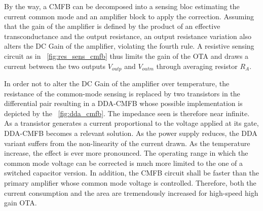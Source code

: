 By the way, a CMFB can be decomposed into a sensing bloc estimating the current common mode and an amplifier block to apply the correction. Assuming that the gain of the amplifier is defined by the product of an effective transconductance and the output resistance, an output resistance variation also alters the DC Gain of the amplifier, violating the fourth rule. A resistive sensing circuit as in \figurename~\ref{fig:res_sens_cmfb} thus limits the gain of the OTA and draws a current between the two outputs \(V_{outp}\) and \(V_{outm}\) through averaging resistor \(R_A \). 

In order not to alter the DC Gain of the amplifier over temperature, the resistance of the common-mode sensing is replaced by two transistors in the differential pair resulting in a DDA-CMFB whose possible implementation is depicted by the \figurename~\ref{fig:dda_cmfb}. The impedance seen is therefore near infinite. As a transistor generates a current proportional to the voltage applied at its gate, DDA-CMFB becomes a relevant solution. As the power supply reduces, the DDA variant suffers from the non-linearity of the current drawn. As the temperature increase, the effect is ever more pronounced. The operating range in which the common mode voltage can be corrected is much more limited to the one of a switched capacitor version. In addition, the CMFB circuit shall be faster than the primary amplifier whose common mode voltage is controlled. Therefore, both the current consumption and the area are tremendously increased for high-speed high gain OTA\@.

